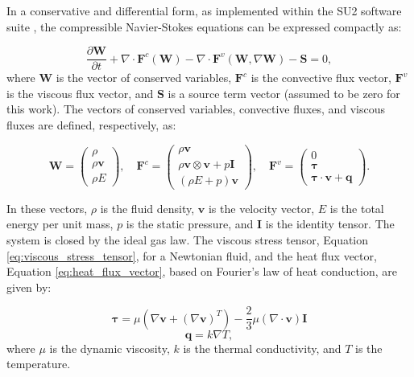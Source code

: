 \documentclass[tg, EN]{ufabcFHZh_tg}
\newcommand{\tens}[1]{\mathbf{#1}}  %
\begin{document}
In a conservative and differential form, as implemented within the SU2 software suite \citep{su2_theory}, the compressible Navier-Stokes equations can be expressed compactly as:

\begin{equation}
    \frac{\partial \mathbf{W}}{\partial t} + \nabla \cdot \mathbf{F}^c(\mathbf{W}) - \nabla \cdot \mathbf{F}^v(\mathbf{W}, \nabla \mathbf{W}) - \mathbf{S} = 0,
    \label{eq:rans_compact}
\end{equation}
where $\mathbf{W}$ is the vector of conserved variables, $\mathbf{F}^c$ is the convective flux vector, $\mathbf{F}^v$ is the viscous flux vector, and $\mathbf{S}$ is a source term vector (assumed to be zero for this work). The vectors of conserved variables, convective fluxes, and viscous fluxes are defined, respectively, as:

\begin{equation}
\mathbf{W} = \begin{pmatrix} \rho \\ \rho \mathbf{v} \\ \rho E \end{pmatrix}, \quad
\mathbf{F}^c = \begin{pmatrix} \rho \mathbf{v} \\ \rho \mathbf{v} \otimes \mathbf{v} + p\tens{I} \\ (\rho E + p)\mathbf{v} \end{pmatrix}, \quad
\mathbf{F}^v = \begin{pmatrix} 0 \\ \boldsymbol{\tau} \\ \boldsymbol{\tau} \cdot \mathbf{v} + \mathbf{q} \end{pmatrix}.
\end{equation}

In these vectors, $\rho$ is the fluid density, $\mathbf{v}$ is the velocity vector, $E$ is the total energy per unit mass, $p$ is the static pressure, and $\mathbf{I}$ is the identity tensor. The system is closed by the ideal gas law. The viscous stress tensor, Equation \eqref{eq:viscous_stress_tensor}, for a Newtonian fluid, and the heat flux vector, Equation \eqref{eq:heat_flux_vector}, based on Fourier's law of heat conduction, are given by:


\begin{equation}
\boldsymbol{\tau} = \mu \left( \nabla \mathbf{v} + (\nabla \mathbf{v})^T \right) - \frac{2}{3}\mu (\nabla \cdot \mathbf{v})\mathbf{I}
\label{eq:viscous_stress_tensor}
\end{equation}
\begin{equation}
\mathbf{q} = k \nabla T,
\label{eq:heat_flux_vector}
\end{equation}
where $\mu$ is the dynamic viscosity, $k$ is the thermal conductivity, and $T$ is the temperature.
\end{document}
